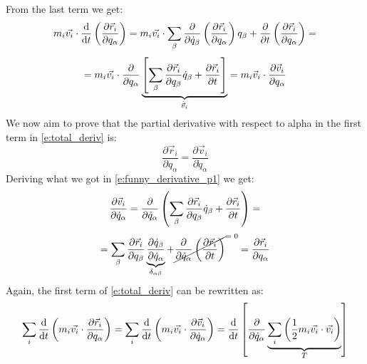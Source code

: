 From the last term we get:
\begin{equation}
    m_i\vec{v_i} \cdot \dv{}{t}\brackets{\dfrac{\partial \vec{r}_i}{\partial q_{\alpha}}} = m_i\vec{v_i} \cdot \bigsum_{\beta} \dfrac{\partial}{\partial \dot{q}_{\beta} }\brackets{\dfrac{\partial \vec{r}_i}{\partial q_{\alpha}}} q_{\beta} + \dfrac{\partial}{\partial t}\brackets{\dfrac{\partial \vec{r}_i}{\partial q_{\alpha}}} =
\end{equation}
\begin{equation} \label{e:funny_derivative_p1}
    = m_i\vec{v_i} \cdot \dfrac{\partial}{\partial q_{\alpha} }\underbrace{\left[\displaystyle\sum_{\beta} \dfrac{\partial \vec{r}_i}{\partial q_{\beta}} \dot{q}_{\beta} + \dfrac{\partial \vec{r}_i}{\partial t}\right]}_{\dot{\vec{v}}_i} = m_i\vec{v}_i \cdot \dfrac{\partial \vec{v}_i}{\partial q_{\alpha}}
\end{equation}
We now aim to prove that the partial derivative with respect to alpha in the first term in \eqref{e:total_deriv} is:
\begin{equation}
    \dfrac{\partial \vec{r}_i}{\partial q_{\alpha}} = \dfrac{\partial \vec{v}_i}{\partial \dot{q}_{\alpha}}
\end{equation}
Deriving what we got in \eqref{e:funny_derivative_p1} we get:
\begin{equation}
    \dfrac{\partial \vec{v}_i}{\partial \dot{q}_{\alpha}} = \dfrac{\partial }{\partial \dot{q}_{\alpha}} \left(\displaystyle\sum_{\beta}\dfrac{\partial \vec{r}_i}{\partial q_{\beta}} \dot{q}_{\beta} + \dfrac{\partial \vec{r}_i}{\partial t}\right) =
\end{equation}
\begin{equation}
     = \bigsum_{\beta}\dfrac{\partial \vec{r}_i}{\partial q_{\beta}} \underbrace{\dfrac{\partial \dot{q}_{\beta}}{\partial \dot{q}_{\alpha}}}_{\delta_{\alpha \beta}}  + \crossout{\dfrac{\partial }{\partial \dot{q}_{\alpha}}\brackets{\dfrac{\partial \vec{r}_i}{\partial t}}} = \dfrac{\partial \vec{r}_i}{\partial q_{\alpha}}
\end{equation}
Again, the first term of \eqref{e:total_deriv} can be rewritten as:
\begin{equation}
    \bigsum_i \dv{}{t}\brackets{m_i\vec{v_i} \cdot \dfrac{\partial \vec{r}_i}{\partial q_{\alpha}}} = \bigsum_i\dv{}{t}\brackets{m_i\vec{v_i} \cdot \dfrac{\partial \vec{v}_i}{\partial \dot{q}_{\alpha}}} = \dv{}{t}\left[\dfrac{\partial }{\partial \dot{q}_{\alpha}} \underbrace{\bigsum_i \brackets{\dfrac{1}{2}m_i \vec{v_i} \cdot \vec{v_i}}}_{T}\right]
\end{equation}
